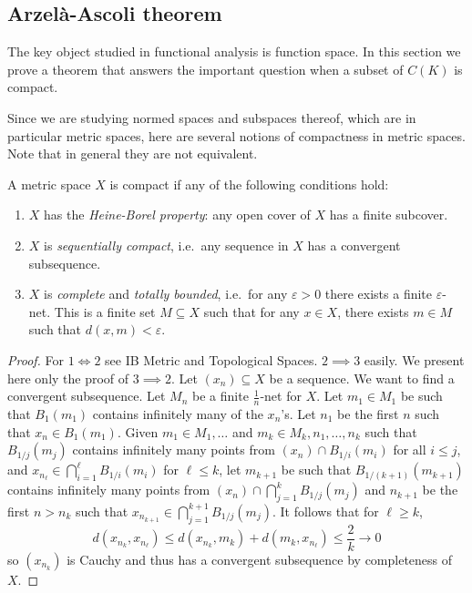 \documentclass[a4paper]{article}
\begin{document}
\subsection{Arzelà-Ascoli theorem}

The key object studied in functional analysis is function space. In this section we prove a theorem that answers the important question when a subset of \(C(K)\) is compact.

Since we are studying normed spaces and subspaces thereof, which are in particular metric spaces, here are several notions of compactness in metric spaces. Note that in general they are not equivalent.

\begin{definition}
  A metric space \(X\) is compact if any of the following conditions hold:
  \begin{enumerate}
  \item \(X\) has the \emph{Heine-Borel property}: any open cover of \(X\) has a finite subcover.
  \item \(X\) is \emph{sequentially compact}, i.e.\ any sequence in \(X\) has a convergent subsequence.
  \item \(X\) is \emph{complete} and \emph{totally bounded}, i.e.\ for any \(\varepsilon > 0\) there exists a finite \(\varepsilon\)-net. This is a finite set \(M \subseteq X\) such that for any \(x \in X\), there exists \(m \in M\) such that \(d(x, m) < \varepsilon\).
  \end{enumerate}
\end{definition}

\begin{proof}
  For \(1 \iff 2\) see IB Metric and Topological Spaces. \(2 \implies 3\) easily. We present here only the proof of \(3 \implies 2\). Let \((x_n) \subseteq X\) be a sequence. We want to find a convergent subsequence. Let \(M_n\) be a finite \(\frac{1}{n}\)-net for \(X\). Let \(m_1 \in M_1\) be such that \(B_1(m_1)\) contains infinitely many of the \(x_n\)'s. Let \(n_1\) be the first \(n\) such that \(x_n \in B_1(m_1)\). Given \(m_1 \in M_1, \dots\) and \(m_k \in M_k, n_1, \dots, n_k\) such that \(B_{1/j}(m_j)\) contains infinitely many points from \((x_n) \cap B_{1/i}(m_i)\) for all \(i \leq j\), and \(x_{n_\ell} \in \bigcap_{i = 1}^\ell B_{1/i}(m_i)\) for \(\ell \leq k\), let \(m_{k + 1}\) be such that \(B_{1/(k + 1)}(m_{k + 1})\) contains infinitely many points from \((x_n) \cap \bigcap_{j = 1}^k B_{1/j}(m_j)\) and \(n_{k + 1}\) be the first \(n > n_k\) such that \(x_{n_{k + 1}} \in \bigcap_{j = 1}^{k + 1} B_{1/j}(m_j)\). It follows that for \(\ell \geq k\),
  \[
    d(x_{n_k}, x_{n_\ell}) \leq d(x_{n_k}, m_k) + d(m_k, x_{n_\ell}) \leq \frac{2}{k} \to 0
  \]
  so \((x_{n_k})\) is Cauchy and thus has a convergent subsequence by completeness of \(X\).
\end{proof}
\end{document}
